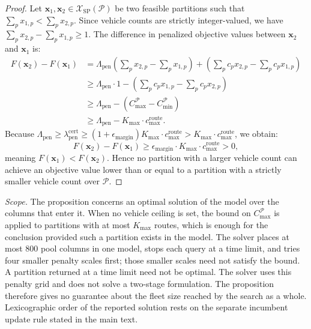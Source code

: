 \documentclass{article}
\begin{document}
\begin{proof}
Let $\mathbf{x}_1, \mathbf{x}_2 \in \mathcal{X}_{\text{SP}}(\mathcal{P})$ be two feasible partitions such that $\sum_{p} x_{1,p} < \sum_{p} x_{2,p}$. Since vehicle counts are strictly integer-valued, we have $\sum_{p} x_{2,p} - \sum_{p} x_{1,p} \ge 1$.
The difference in penalized objective values between $\mathbf{x}_2$ and $\mathbf{x}_1$ is:
\begin{align}
F(\mathbf{x}_2) - F(\mathbf{x}_1) &= \Lambda_{\text{pen}} \left(\sum_p x_{2,p} - \sum_p x_{1,p}\right) + \left(\sum_p c_p x_{2,p} - \sum_p c_p x_{1,p}\right) \\
&\ge \Lambda_{\text{pen}} \cdot 1 - \left(\sum_p c_p x_{1,p} - \sum_p c_p x_{2,p}\right) \\
&\ge \Lambda_{\text{pen}} - (C_{\max}^{\mathcal{P}} - C_{\min}^{\mathcal{P}}) \\
&\ge \Lambda_{\text{pen}} - K_{\max} \cdot c_{\max}^{\text{route}}.
\end{align}
Because $\Lambda_{\text{pen}} \ge \lambda_{\text{pen}}^{\text{cert}} \ge (1 + \epsilon_{\text{margin}}) K_{\max} \cdot c_{\max}^{\text{route}} > K_{\max} \cdot c_{\max}^{\text{route}}$, we obtain:
\begin{equation}
F(\mathbf{x}_2) - F(\mathbf{x}_1) \ge \epsilon_{\text{margin}} \cdot K_{\max} \cdot c_{\max}^{\text{route}} > 0,
\end{equation}
meaning $F(\mathbf{x}_1) < F(\mathbf{x}_2)$. Hence no partition with a larger vehicle count can achieve an objective value lower than or equal to a partition with a strictly smaller vehicle count over $\mathcal{P}$.
\end{proof}

\emph{Scope.} The proposition concerns an optimal solution of the model over the columns that enter it. When no vehicle ceiling is set, the bound on $C_{\max}^{\mathcal{P}}$ is applied to partitions with at most $K_{\max}$ routes, which is enough for the conclusion provided such a partition exists in the model. The solver places at most 800 pool columns in one model, stops each query at a time limit, and tries four smaller penalty scales first; those smaller scales need not satisfy the bound. A partition returned at a time limit need not be optimal. The solver uses this penalty grid and does not solve a two-stage formulation. The proposition therefore gives no guarantee about the fleet size reached by the search as a whole. Lexicographic order of the reported solution rests on the separate incumbent update rule stated in the main text.
\end{document}
